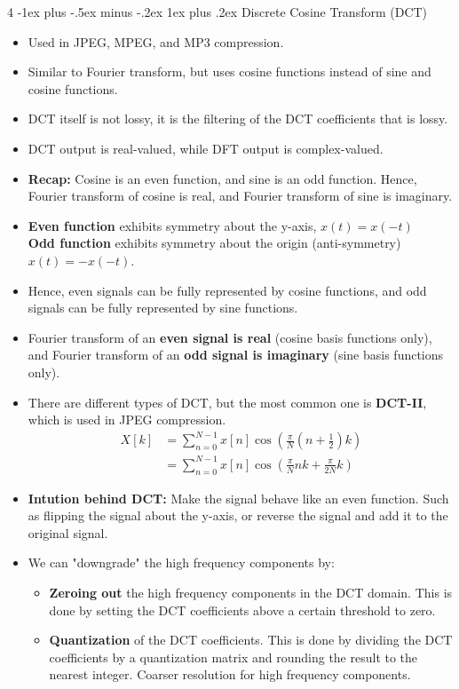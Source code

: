 \documentclass[10pt, landscape]{article}
\makeatletter
\renewcommand{\subsubsection}{\@startsection{subsubsection}{3}{0mm}%
  {-1ex plus -.5ex minus -.2ex}%
  {1ex plus .2ex}%
{\normalfont\small\bfseries}}%
\makeatother
\begin{document}
\begin{multicols*}{4}
    \subsubsection{Discrete Cosine Transform (DCT)}
    \begin{itemize}
      \item Used in JPEG, MPEG, and MP3 compression.
      \item Similar to Fourier transform, but uses cosine functions instead of sine and cosine functions.
      \item DCT itself is not lossy, it is the filtering of the DCT coefficients that is lossy.
      \item DCT output is real-valued, while DFT output is complex-valued.
      \item \textbf{Recap:} Cosine is an even function, and sine is an odd function. Hence, Fourier transform of cosine is real, and Fourier transform of sine is imaginary.
      \item \textbf{Even function} exhibits symmetry about the y-axis, $x(t) = x(-t)$ \\ \textbf{Odd function} exhibits symmetry about the origin (anti-symmetry) $x(t) = -x(-t)$.
      \item Hence, even signals can be fully represented by cosine functions, and odd signals can be fully represented by sine functions.
      \item Fourier transform of an \textbf{even signal is real} (cosine basis functions only), and Fourier transform of an \textbf{odd signal is imaginary} (sine basis functions only).
      \item There are different types of DCT, but the most common one is \textbf{DCT-II}, which is used in JPEG compression.
      \begin{equation}
        \begin{aligned}
          X[k] & = \sum_{n=0}^{N-1} x[n] \cos\left(\frac{\pi}{N} \left(n + \frac{1}{2}\right) k\right) \\
          & = \sum_{n=0}^{N-1} x[n] \cos\left(\frac{\pi}{N} n k + \frac{\pi}{2N} k\right)
        \end{aligned}
      \end{equation}
      \item \textbf{Intution behind DCT:} Make the signal behave like an even function. Such as flipping the signal about the y-axis, or reverse the signal and add it to the original signal.
      \item We can "downgrade" the high frequency components by:
      \begin{itemize}
        \item \textbf{Zeroing out} the high frequency components in the DCT domain. This is done by setting the DCT coefficients above a certain threshold to zero.
        \item \textbf{Quantization} of the DCT coefficients. This is done by dividing the DCT coefficients by a quantization matrix and rounding the result to the nearest integer. Coarser resolution for high frequency components.
      \end{itemize}
    \end{itemize}


\end{multicols*}
\end{document}
